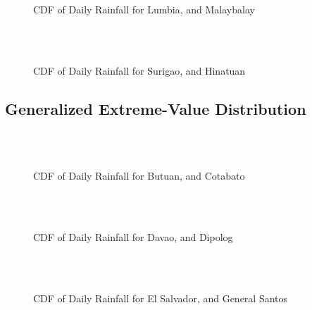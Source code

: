 \begin{figure}[H]
  \centering
  \\
  \\
  \caption{CDF of Daily Rainfall for Lumbia, and Malaybalay}
  \label{fig:weekly_without_threshold_appendix_gpd_pt4}
\end{figure}

\begin{figure}[H]
  \centering
  \\
  \\
  \caption{CDF of Daily Rainfall for Surigao, and Hinatuan}
  \label{fig:weekly_without_threshold_appendix_gpd_pt5}
\end{figure}

\subsection{Generalized Extreme-Value Distribution}

\begin{figure}[H]
  \centering
  \\
  \\
  \caption{CDF of Daily Rainfall for Butuan, and Cotabato}
  \label{fig:weekly_without_threshold_appendix_gev_pt1}
\end{figure}

\begin{figure}[H]
  \centering
  \\
  \\
  \caption{CDF of Daily Rainfall for Davao, and Dipolog}
  \label{fig:weekly_without_threshold_appendix_gev_pt2}
\end{figure}

\begin{figure}[H]
  \centering
  \\
  \\
  \caption{CDF of Daily Rainfall for El Salvador, and General Santos}
  \label{fig:weekly_without_threshold_appendix_gev_pt3}
\end{figure}

